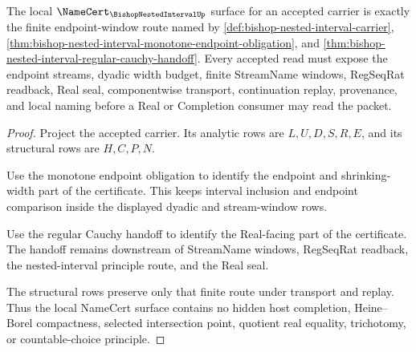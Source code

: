 \begin{theorem}
\label{thm:bishop-nested-interval-namecert-surface}
The local $\NameCert_{\BishopNestedIntervalUp}$ surface for an accepted carrier is exactly the finite endpoint-window route named by \autoref{def:bishop-nested-interval-carrier}, \autoref{thm:bishop-nested-interval-monotone-endpoint-obligation}, and \autoref{thm:bishop-nested-interval-regular-cauchy-handoff}. Every accepted read must expose the endpoint streams, dyadic width budget, finite StreamName windows, RegSeqRat readback, Real seal, componentwise transport, continuation replay, provenance, and local naming before a Real or Completion consumer may read the packet.
\end{theorem}
\begin{proof}
Project the accepted carrier. Its analytic rows are $L,U,D,S,R,E$, and its structural rows are $H,C,P,N$.

Use the monotone endpoint obligation to identify the endpoint and shrinking-width part of the certificate. This keeps interval inclusion and endpoint comparison inside the displayed dyadic and stream-window rows.

Use the regular Cauchy handoff to identify the Real-facing part of the certificate. The handoff remains downstream of StreamName windows, RegSeqRat readback, the nested-interval principle route, and the Real seal.

The structural rows preserve only that finite route under transport and replay. Thus the local NameCert surface contains no hidden host completion, Heine--Borel compactness, selected intersection point, quotient real equality, trichotomy, or countable-choice principle.
\end{proof}



